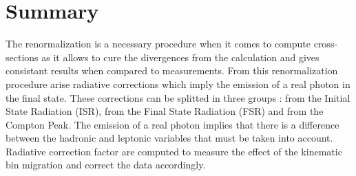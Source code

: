 
\section{Summary}

The renormalization is a necessary procedure when it comes to compute cross-sections as it allows to cure the divergences from the calculation and gives consistant results when compared to measurements. From this renormalization procedure arise radiative corrections which imply the emission of a real photon in the final state. These corrections can be splitted in three groups : from the Initial State Radiation (ISR), from the Final State Radiation (FSR) and from the Compton Peak. The emission of a real photon implies that there is a difference between the hadronic and leptonic variables that must be taken into account. Radiative correction factor are computed to measure the effect of the kinematic bin migration and correct the data accordingly.
